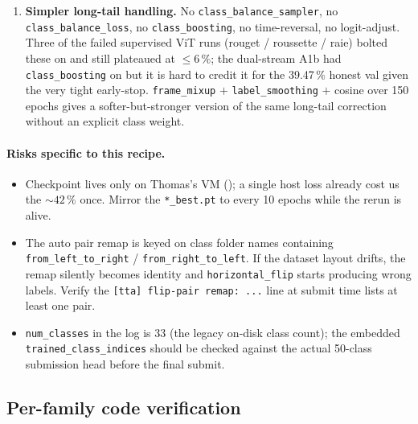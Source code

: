 \begin{enumerate}[leftmargin=*]
   the flipped softmax for direction-sensitive classes; for the
   majority of classes flipping is label-preserving and acts as a free
   2\(\times\) augmentation.  The SSL ViT runs play conservative
   (\texttt{horizontal\_flip}=) and forgo this win.
\item \textbf{Simpler long-tail handling.}  No
   \texttt{class\_balance\_sampler}, no \texttt{class\_balance\_loss},
   no \texttt{class\_boosting}, no time-reversal, no logit-adjust.
   Three of the failed supervised ViT runs (rouget / roussette / raie)
   bolted these on and still plateaued at \(\le 6\,\%\); the dual-stream
   A1b had \texttt{class\_boosting} on but it is hard to credit it for
   the 39.47\,\% honest val given the very tight early-stop.
   \texttt{frame\_mixup} \(+\) \texttt{label\_smoothing} \(+\) cosine
   over 150 epochs gives a softer-but-stronger version of the same
   long-tail correction without an explicit class weight.
\end{enumerate}

\paragraph{Risks specific to this recipe.}

\begin{itemize}[leftmargin=2em]
\item Checkpoint lives only on Thomas's VM
   (); a single host loss
   already cost us the \(\sim 42\,\%\) once.  Mirror the
   \texttt{*\_best.pt} to
   every 10 epochs while the rerun is alive.
\item The auto pair remap is keyed on class folder names containing
   \texttt{from\_left\_to\_right} / \texttt{from\_right\_to\_left}.  If
   the dataset layout drifts, the remap silently becomes identity and
   \texttt{horizontal\_flip} starts producing wrong labels.  Verify the
   \texttt{[tta] flip-pair remap: ...} line at submit time lists at
   least one pair.
\item \texttt{num\_classes} in the log is 33 (the legacy on-disk class
   count); the embedded
   \texttt{trained\_class\_indices} should be checked against the
   actual 50-class submission head before the final submit.
\end{itemize}

\subsection{Per-family code verification}
\label{sec:tracka:inventory:verification}


